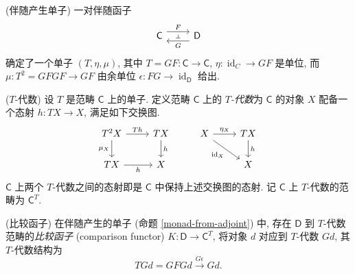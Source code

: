 \begin{propdef}
    [label={monad-from-adjoint}]
    {(伴随产生单子)}
    一对伴随函子
    $$
    \begin{tikzcd}[ampersand replacement=\&]
    	{\mathsf C} \& {\mathsf D}
    	\arrow[""{name=0, anchor=center, inner sep=0}, "G", shift left=2, from=1-2, to=1-1]
    	\arrow[""{name=1, anchor=center, inner sep=0}, "F", shift left=2, from=1-1, to=1-2]
    	\arrow["\dashv"{anchor=center, rotate=-90}, draw=none, from=1, to=0]
    \end{tikzcd}
    $$
    确定了一个单子 $(T,\eta,\mu)$, 其中 $T = GF \colon \mathsf C \to \mathsf C$,
    $\eta \colon \operatorname{id}_{C} \to GF$ 是单位, 而 $\mu \colon T^2 = GFGF \to GF$ 由余单位 $\epsilon \colon FG \to \operatorname{id}_{\mathsf D}$ 给出.
\end{propdef}

\begin{definition}
    [label={monad-T-algebra}]
    {($T$-代数)}
    设 $T$ 是范畴 $\mathsf C$ 上的单子.
    定义范畴 $\mathsf C$ 上的 \emph{$T$-代数}为 $\mathsf C$ 的对象 $X$ 配备一个态射 $h \colon TX \to X$,
    满足如下交换图.
    \[
    \begin{tikzcd}[ampersand replacement=\&]
    	{T^2X} \& TX \& X \& TX \\
    	TX \& X \&\& X
    	\arrow["Th", from=1-1, to=1-2]
    	\arrow["{\mu_X}"', from=1-1, to=2-1]
    	\arrow["h"', from=2-1, to=2-2]
    	\arrow["h", from=1-2, to=2-2]
    	\arrow["h", from=1-4, to=2-4]
    	\arrow["{\operatorname{id}_X}"', from=1-3, to=2-4]
    	\arrow["{\eta_X}", from=1-3, to=1-4]
    \end{tikzcd}
    \]
    $\mathsf C$ 上两个 $T$-代数之间的态射即是 $\mathsf C$ 中保持上述交换图的态射.
    记 $\mathsf C$ 上 $T$-代数的范畴为 $\mathsf C^{T}$.
\end{definition}

\begin{propdef}
    {(比较函子)}
    在伴随产生的单子 (命题 \ref{monad-from-adjoint}) 中, 存在 $\mathsf D$ 到 $T$-代数范畴的\emph{比较函子} (comparison functor) $K\colon \mathsf D\to\mathsf C^T$,
    将对象 $d$ 对应到 $T$-代数 $Gd$, 其 $T$-代数结构为
    $$
    TGd=GFGd\overset{G\epsilon}{\longrightarrow}Gd.
    $$
\end{propdef}

